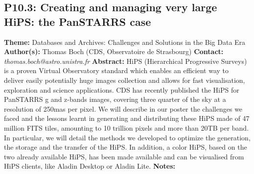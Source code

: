 \documentclass{report}
\begin{document}
{{{{{{{{{{{{{{{{{{\subsection*{P10.3: Creating and managing very large HiPS: the PanSTARRS case}
{\bf Theme:}  Databases and Archives: Challenges and Solutions in the Big Data Era\newline
{\bf Author(s):}\newline
Thomas Boch (CDS, Observatoire de Strasbourg) \newline   \newline   \newline   \newline  \newline  \newline\newline
{\bf Contact:} {\it thomas.boch@astro.unistra.fr}\newline
\newline\newline
{\bf Abstract:}\newline
HiPS (Hierarchical Progressive Surveys) is a proven Virtual Observatory standard which enables an efficient way to deliver easily potentially huge images collection and allows for fast visualisation, exploration and science applications. CDS has recently published the HiPS for PanSTARRS g and z-bands images, covering three quarter of the sky at a resolution of 250mas per pixel.
We will describe in our poster the challenges we faced and the lessons learnt in generating and distributing these HiPS made of 47 million FITS tiles, amounting to 10 trillion pixels and more than 20TB per band. In particular, we will detail the methods we developed to optimize the generation, the storage and the transfer of the HiPS.
In addition, a color HiPS, based on the two already available HiPS, has been made available and can be visualised from HiPS clients, like Aladin Desktop or Aladin Lite.\newline
{\bf Notes:}\newline
{\newpage
}}}}}}}}}}}}}}}}}}}
\end{document}

